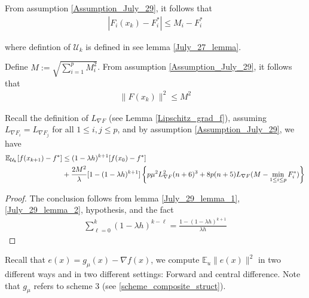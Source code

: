 \documentclass{article}
\begin{document}
\begin{lemma} \label{July_29_lemma_1} From assumption \ref{Assumption_July_29}, it follows that 
\begin{align}
|F_i(x_k) - F_i^*| \leq M_i - F_i^*
\end{align}
\end{lemma}

where defintion of $\mathcal{U}_k$ is defined in see lemma \ref{July_27_lemma}.

\begin{lemma} \label{July_29_lemma_2}
Define $M:= \sqrt{\sum_{i=1}^pM_i^2}$. From assumption \ref{Assumption_July_29}, it follows that 
\begin{align}
\|F(x_k)\|^2 \leq M^2
\end{align}
\end{lemma}

\begin{theorem}
Recall the definition of $L_{\nabla F}$ (see Lemma \ref{Lipschitz_grad_f}), assuming $L_{\nabla F_i} = L_{\nabla F_j}$ for all $1 \leq i,j \leq p$, and by assumption \ref{Assumption_July_29}, we have 
\begin{align}
\mathbb{E}_{\mathcal{U}_k}[f(x_{k+1}) - f^*] & \leq (1-\lambda h)^{k+1}[f(x_0) - f^*] \notag \\ & + \frac{2M^2}{\lambda}[1-(1-\lambda h)^{k+1}]\left\{p\mu^2 L_{\nabla F}^2(n+6)^3 + 8p(n+5)L_{\nabla F}(M-\min_{1 \leq i \leq p}F_i^*)\right\}
\end{align}

\begin{proof}
The conclusion follows from lemma \ref{July_29_lemma_1}, \ref{July_29_lemma_2}, hypothesis, and the fact
\begin{align*}
\sum_{\ell = 0}^k(1-\lambda h)^{k-\ell} = \frac{1 - (1-\lambda h)^{k+1}}{\lambda h}
\end{align*}
\end{proof}
\end{theorem}

Recall that $e(x) = g_{\mu}(x) - \nabla f(x)$, we compute $\mathbb{E}_u\|e(x)\|^2$ in two different ways and in two different settings: Forward and central difference. Note that $g_{\mu}$ refers to scheme $3$ (see \ref{scheme_composite_struct}). 
\end{document}

